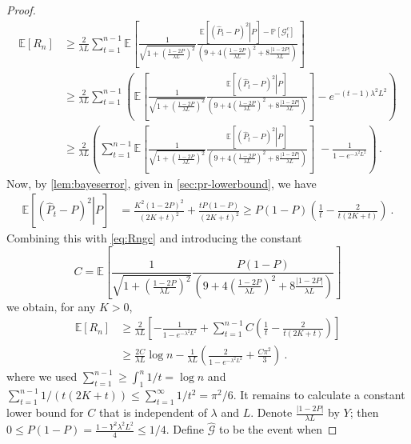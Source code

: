 \documentclass[english]{article}
\newcommand{\cG}{\mathcal{G}}
\newcommand{\hP}{\hat{P}}
\newcommand{\Exp}[1]{\mathbb{E}\left[ #1 \right]}
\newcommand{\Expc}[2]{\mathbb{E}\left[ \left. #1 \right| #2 \right]}
\newcommand{\Prob}[1]{\mathbb{P}\left[#1\right]}
\begin{document}
\begin{proof}
\begin{align}
	\Exp{R_n} & \ge 
	\frac{2}{\lambda L}\sum_{t=1}^{n-1} \Exp{\frac{1}{\sqrt{1+\left( \frac{1-2P}{\lambda L}\right)^2 }}\frac{\Expc{ ( \hP_{t} - P )^2 }{P}-\Prob{\cG^c_t}}{ \left(9+ 4\left( \frac{1-2P}{\lambda L}\right)^2 +8 \frac{|1-2P|}{\lambda L} \right)}  } \nonumber \\
	& \ge \frac{2}{\lambda L}\sum_{t=1}^{n-1} \left( \Exp{\frac{1}{\sqrt{1+\left( \frac{1-2P}{\lambda L}\right)^2 }}\frac{\Expc{ ( \hP_{t} - P )^2 }{P}}{ \left(9+ 4\left( \frac{1-2P}{\lambda L}\right)^2 +8 \frac{|1-2P|}{\lambda L} \right)}  } - e^{-(t-1)\lambda^2L^2} \right) \nonumber \\
	& \ge \frac{2}{\lambda L}\left(\sum_{t=1}^{n-1} \Exp{\frac{1}{\sqrt{1+\left( \frac{1-2P}{\lambda L}\right)^2 }}\frac{\Expc{ ( \hP_{t} - P )^2 }{P}}{ \left(9+ 4\left( \frac{1-2P}{\lambda L}\right)^2 +8 \frac{|1-2P|}{\lambda L} \right)}  }  \; -  \frac{1}{1-e^{-\lambda^2L^2}} \right)\,. \label{eq:Rngc}
	\end{align} 
	Now, by \cref{lem:bayeserror}, given in \cref{sec:pr-lowerbound}, we have
	\begin{align*}
	\Expc{ ( \hP_{t} - P )^2 }{P} & = \frac{K^2(1-2P)^2}{(2K+t)^2} + \frac{tP(1-P)}{(2K+t)^2} \ge P(1-P) \left( \frac{1}{t} - \frac{2}{t(2K+t)} \right)~. 
	\end{align*}
	Combining this with \eqref{eq:Rngc} and introducing the constant
	\[
	C = \Exp{\frac{1}{\sqrt{1+\left( \frac{1-2P}{\lambda L}\right)^2 }}\frac{P(1-P)}{ \left(9+ 4\left( \frac{1-2P}{\lambda L}\right)^2 +8 \frac{|1-2P|}{\lambda L} \right)}  } 
	\]
	we obtain, for any $K>0$,
	\begin{align}
	\Exp{R_n}& \ge \frac{2}{\lambda L}\left[ - \frac{1}{1-e^{-\lambda^2L^2}} + \sum_{t=1}^{n-1} C\left(\frac{1}{t} - \frac{2}{t(2K+t)} \right) \right] \\
	 & \ge  \frac{2 C}{\lambda L} \log n - \frac{1}{\lambda L} \left(\frac{2}{1-e^{-\lambda^2L^2}} + \frac{C \pi^2}{3}\right)~.
	\end{align}
	where we used $\sum_{t=1}^{n-1} \ge \int_1^n 1/t = \log n$ and $\sum_{t=1}^{n-1} 1/(t(2K+t)) \le \sum_{t=1}^\infty 1/t^2 = \pi^2/6$.
	It remains to calculate a constant lower bound for $C$ that is independent of $\lambda$ and $L$. Denote $\frac{|1-2P|}{\lambda L}$ by $Y$; then $0\le P(1-P) = \frac{1-Y^2\lambda^2L^2}{4}\le 1/4$. Define $\widehat{\cG}$ to be the event when 

\end{proof}
\end{document}
